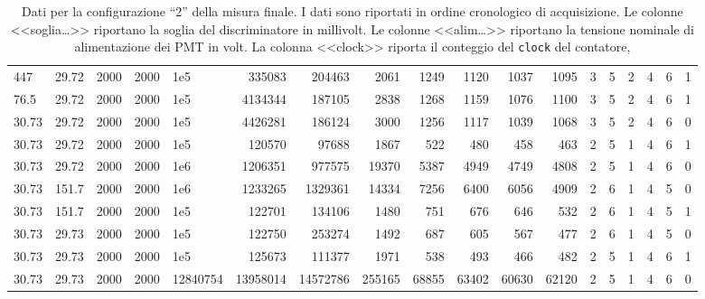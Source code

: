 \begin{landscape}
\begin{table}
\begin{tabular}{llll|lrrrrrrr|ccccc|c}
			447 & 29.72 & 2000 & 2000 & 1e5 & 335083 & 204463 & 2061 & 1249 & 1120 & 1037 & 1095 & 3 & 5 & 2 & 4 & 6 & 1    \\   %
			76.5 & 29.72 & 2000 & 2000 & 1e5 & 4134344 & 187105 & 2838 & 1268 & 1159 & 1076 & 1100 & 3 & 5 & 2 & 4 & 6 & 1      \\   %
			30.73 & 29.72 & 2000 & 2000 & 1e5 & 4426281 & 186124 & 3000 & 1256 & 1117 & 1039 & 1068 & 3 & 5 & 2 & 4 & 6 & 0     \\  %
			\hline
			30.73 & 29.72 & 2000 & 2000 & 1e5 & 120570 & 97688 & 1867 & 522 & 480 & 458 & 463 & 2 & 5 & 1 & 4 & 6 & 1                             \\
			30.73 & 29.72 & 2000 & 2000 & 1e6 & 1206351 & 977575 & 19370 & 5387 & 4949 & 4749 & 4808 & 2 & 5 & 1 & 4 & 6 & 0                      \\
			\hline
			30.73 & 151.7 & 2000 & 2000 & 1e6 & 1233265 & 1329361 & 14334 & 7256 & 6400 & 6056 & 4909 & 2 & 6 & 1 & 4 & 5 & 0                   \\
			30.73 & 151.7 & 2000 & 2000 & 1e5 & 122701 & 134106 & 1480 & 751 & 676 & 646 & 532 & 2 & 6 & 1 & 4 & 5 & 1                          \\
			30.73 & 29.73 & 2000 & 2000 & 1e5 & 122750 & 253274 & 1492 & 687 & 605 & 567 & 477 & 2 & 6 & 1 & 4 & 5 & 0                            \\
			\hline
			30.73 & 29.73 & 2000 & 2000 & 1e5 & 125673 & 111377 & 1971 & 538 & 493 & 466 & 482 & 2 & 5 & 1 & 4 & 6 & 1                            \\
			30.73 & 29.73 & 2000 & 2000 & 12840754 & 13958014 & 14572786 & 255165 & 68855 & 63402 & 60630 & 62120 & 2 & 5 & 1 & 4 & 6 & 0         
		\end{tabular}
		\caption{\label{tab:data2}
		Dati per la configurazione ``2'' della misura finale.
		I dati sono riportati in ordine cronologico di acquisizione.
		Le colonne <<soglia\dots>> riportano la soglia del discriminatore in millivolt.
		Le colonne <<alim\dots>> riportano la tensione nominale di alimentazione dei PMT in volt.
		La colonna <<clock>> riporta il conteggio del \texttt{clock} del contatore,
}
\end{table}
\end{landscape}
